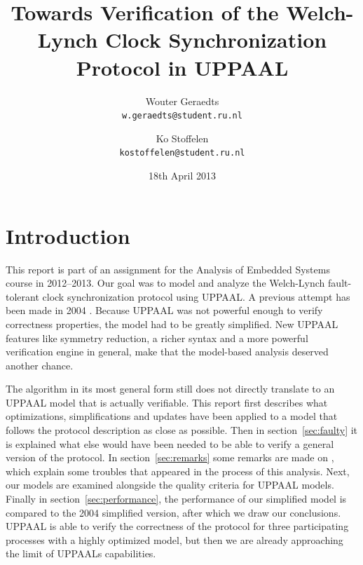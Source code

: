 \documentclass[a4paper,10pt]{article}
\title{Towards Verification of the Welch-Lynch Clock Synchronization Protocol in UPPAAL}
\author{
	Wouter Geraedts \\ \small{\texttt{w.geraedts@student.ru.nl}} \and
	Ko Stoffelen     \\ \small{\texttt{kostoffelen@student.ru.nl}}
}
\date{18th April 2013}
\newcommand{\UPPAAL}{UPPAAL\xspace}
\newcommand{\newsimple}{our simplified model\xspace}
\begin{document}
	\maketitle






\section{Introduction}


This report is part of an assignment for the Analysis of Embedded Systems course in 2012--2013. Our goal was to model and analyze the Welch-Lynch fault-tolerant clock synchronization protocol \cite{Welch1984Anew} using \UPPAAL. A previous attempt has been made in 2004 \cite{Aceto2004Notes}. Because \UPPAAL was not powerful enough to verify correctness properties, the model had to be greatly simplified. New \UPPAAL features like symmetry reduction, a richer syntax and a more powerful verification engine in general, make that the model-based analysis deserved another chance.

The algorithm in its most general form still does not directly translate to an \UPPAAL model that is actually verifiable. This report first describes what optimizations, simplifications and updates have been applied to a model that follows the protocol description as close as possible. Then in section~\ref{sec:faulty} it is explained what else would have been needed to be able to verify a general version of the protocol. In section~\ref{sec:remarks} some remarks are made on \cite{Aceto2004Notes}, which explain some troubles that appeared in the process of this analysis. Next, our models are examined alongside the quality criteria for \UPPAAL models. Finally in section~\ref{sec:performance}, the performance of \newsimple is compared to the 2004 simplified version, after which we draw our conclusions. \UPPAAL is able to verify the correctness of the protocol for three participating processes with a highly optimized model, but then we are already approaching the limit of \UPPAAL{}s capabilities.
\end{document}
